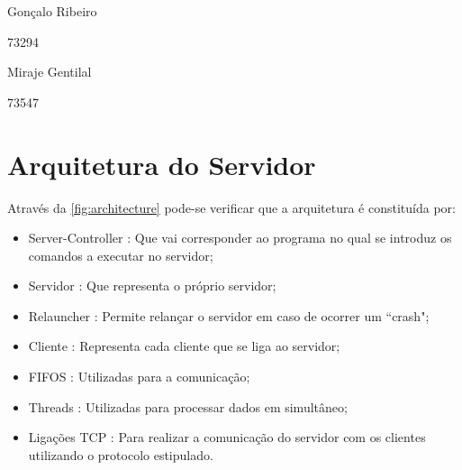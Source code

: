 \documentclass[a4paper]{article}
\begin{document}
	\trSetAuthors
	{
		\begin{center}
			Gonçalo Ribeiro

			73294
		\end{center}
	}{
		\begin{center}
			Miraje Gentilal

			73547
		\end{center}
	}

	\trMakeCover

	\tableofcontents

	\pagebreak

	\setcounter{page}{1}


	\section{Arquitetura do Servidor}

	Através da \autoref{fig:architecture} pode-se verificar que a arquitetura é constituída por: 

	\begin{itemize}
		\item Server-Controller : Que vai corresponder ao programa no qual se introduz os comandos a executar no servidor; 
		\item Servidor : Que representa o próprio servidor; 
		\item Relauncher : Permite relançar o servidor em caso de ocorrer um ``crash"; 
		\item Cliente : Representa cada cliente que se liga ao servidor; 
		\item FIFOS : Utilizadas para a comunicação; 
		\item Threads : Utilizadas para processar dados em simultâneo; 
		\item Ligações TCP : Para realizar a comunicação do servidor com os clientes utilizando o protocolo estipulado. 
	\end{itemize}
\end{document}
